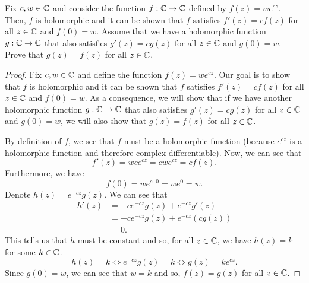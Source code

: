\documentclass[a4paper]{article}
\begin{document}
\begin{problem}
   Fix \( c,w \in \mathbb{C}  \) and consider the function \( f: \mathbb{C} \to \mathbb{C}  \) defined by \( f(z) = w e^{cz} \). Then, \( f  \) is holomorphic and it can be shown that \( f  \) satisfies \( f'(z) = c f(z) \) for all \( z \in \mathbb{C}  \) and \( f(0) = w \). Assume that we have a holomorphic function \( g: \mathbb{C} \to \mathbb{C}  \) that also satisfies \( g'(z) = c g(z) \) for all \( z \in \mathbb{C}  \) and \( g(0) = w  \). Prove that \( g(z) = f(z)  \) for all \( z \in \mathbb{C}  \).   
\end{problem}
\begin{proof}
    Fix \( c,w \in \mathbb{C} \) and define the function \( f(z) = w e^{cz} \). Our goal is to show that \( f  \) is holomorphic and it can be shown that \( f  \) satisfies \( f'(z) = c f(z) \) for all \( z \in \mathbb{C}  \) and \( f(0) = w \). As a consequence, we will show that if we have another holomorphic function \( g: \mathbb{C} \to \mathbb{C}  \) that also satisfies \( g'(z) = c g(z) \) for all \( z \in \mathbb{C}  \) and \( g(0) = w  \), we will also show that \( g(z) = f(z)  \) for all \( z \in \mathbb{C}  \).

    By definition of \( f  \), we see that \( f  \) must be a holomorphic function (because \( e^{cz} \) is a holomorphic function and therefore complex differentiable). Now, we can see that 
    \[  f'(z) = w  c e^{cz} = c w e^{cz} = c f(z).   \]
    Furthermore, we have 
    \[  f(0) = w e^{c \cdot 0} = w e^{0} = w. \]
    Denote \( h(z) = e^{-cz} g(z)  \). We can see that 
    \begin{align*}
        h'(z) &= -c e^{-cz} g(z) + e^{-cz} g'(z) \\
              &= - c e^{-cz} g(z) + e^{-cz} (c g(z)) \\
              &= 0. 
    \end{align*}
    This tells us that \( h  \) must be constant and so, for all \( z \in \mathbb{C}  \), we have \( h(z) = k  \) for some \( k \in \mathbb{C}  \).
    \[ h(z) = k \iff e^{-cz}g(z) = k \iff g(z) = k e^{cz}.  \]
    Since \( g(0) = w \), we can see that \( w = k \) and so, \( f(z) = g(z) \) for all \( z \in \mathbb{C}  \). 
\end{proof}
\end{document}
